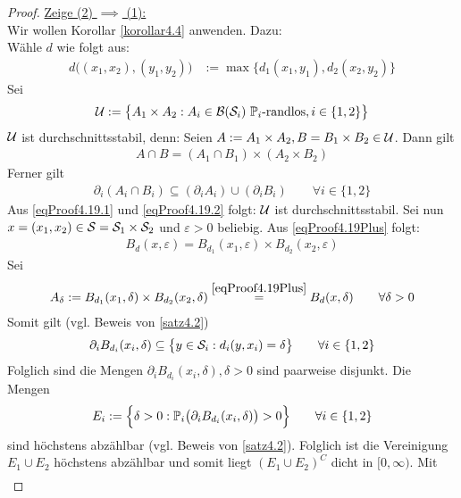 \begin{proof}
\underline{Zeige (2) $\implies$ (1):}\\
Wir wollen Korollar \ref{korollar4.4} anwenden. Dazu:\\
Wähle $d$ wie folgt aus:
\begin{align}\label{eqProof4.19Plus}\tag{+}
d\big((x_1,x_2),(y_1,y_2)\big)&:=\max\big\lbrace d_1(x_1,y_1),d_2(x_2,y_2)\big\rbrace
\end{align}
Sei
\begin{align*}
\U:=\big\lbrace A_1\times A_2:A_i\in\B(\S_i)~\P_i\text{-randlos}, i\in\lbrace1,2\rbrace\big\rbrace 
\end{align*}
$\U$ ist durchschnittsstabil, denn: Seien $A:=A_1\times A_2,B=B_1\times B_2\in\U$. Dann gilt
\begin{align}\label{eqProof4.19.1}\tag{1}
A\cap B=(A_1\cap B_1)\times(A_2\times B_2)
\end{align}
Ferner gilt
\begin{align}\label{eqProof4.19.2}\tag{2}
\partial_i(A_i\cap B_i)\subseteq(\partial_i A_i)\cup(\partial_i B_i)\qquad\forall i\in\lbrace1,2\rbrace
\end{align}
Aus \eqref{eqProof4.19.1} und \eqref{eqProof4.19.2} folgt: $\U$ ist durchschnittsstabil. Sei nun $x=(x_1,x_2)\in\S=\S_1\times\S_2$ und $\varepsilon>0$ beliebig. Aus \eqref{eqProof4.19Plus} folgt:
\begin{align*}
B_d(x,\varepsilon)=B_{d_1}(x_1,\varepsilon)\times B_{d_2}(x_2,\varepsilon)
\end{align*}
Sei 
\begin{align*}
A_\delta:=B_{d_1}(x_1,\delta)\times B_{d_2}(x_2,\delta)
\stackeq{\eqref{eqProof4.19Plus}} B_d(x,\delta)\qquad\forall\delta>0
\end{align*}
Somit gilt (vgl. Beweis von \ref{satz4.2})
\begin{align*}
\partial_i B_{d_i}(x_i,\delta)\subseteq\big\lbrace y\in\S_i:d_i(y,x_i)=\delta\big\rbrace\qquad\forall i\in\lbrace1,2\rbrace
\end{align*}
Folglich sind die Mengen $\partial_i B_{d_i}(x_i,\delta),\delta>0$ sind paarweise disjunkt. Die Mengen
\begin{align*}
E_i:=\Big\lbrace\delta>0:\P_i\big(\partial_i B_{d_i}(x_i,\delta)\big)>0\Big\rbrace\qquad\forall i\in\lbrace1,2\rbrace
\end{align*}
sind höchstens abzählbar (vgl. Beweis von \ref{satz4.2}). Folglich ist die Vereinigung $E_1\cup E_2$ höchstens abzählbar und somit liegt $(E_1\cup E_2)^C$ dicht in $[0,\infty)$. Mit
\begin{align*}

\end{align*}
\end{proof}
